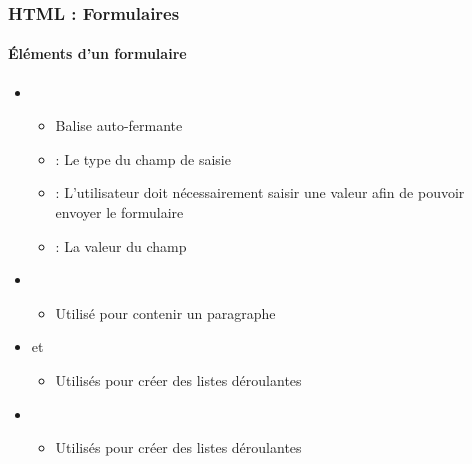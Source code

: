 \documentclass[xcolor=table]{beamer}
\begin{document}
\begin{frame}[fragile]
\frametitle{HTML : Formulaires}
\framesubtitle{Éléments d'un formulaire}

\begin{itemize}
	\item {}
	\begin{itemize}
		\item Balise auto-fermante 
		\item {} : Le type du champ de saisie
		\item {} : L'utilisateur doit nécessairement saisir une valeur afin de pouvoir envoyer le formulaire
		\item {} : La valeur du champ
	\end{itemize}
	\item {}
	\begin{itemize}
		\item Utilisé pour contenir un paragraphe
	\end{itemize}
	\item {} et 
	\begin{itemize}
		\item Utilisés pour créer des listes déroulantes
	\end{itemize}
	\item {}
	\begin{itemize}
		\item Utilisés pour créer des listes déroulantes
	\end{itemize}
\end{itemize}

\end{frame}
\end{document}
